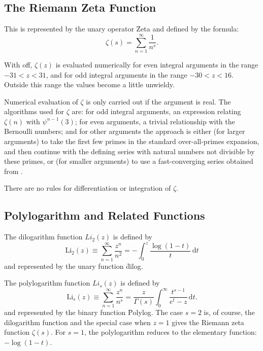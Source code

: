 \subsection{The Riemann Zeta Function}
\hypertarget{operator:ZETA}{}
\hypertarget{RIEMZETA}{}
This is represented by the unary operator \f{Zeta} and defined by the
formula:
$$\zeta(s) = \sum_{n=1}^\infty \frac{1}{n^s}.$$

With  off, $\zeta(z)$ is evaluated numerically for even
integral arguments in the range $-31 < z < 31$, and for odd integral
arguments in the range $-30 < z < 16$.  Outside this range the values
become a little unwieldy.

Numerical evaluation of $\zeta$ is only carried out if the argument is real.
The algorithms used for $\zeta$ are: for odd integral arguments, an
expression relating $\zeta(n)$ with $\psi^{n-1}(3)$; for even arguments, a
trivial relationship with the Bernoulli numbers; and for other arguments the
approach is either (for larger arguments) to take the first few primes in
the standard over-all-primes expansion, and then continue with the defining
series with natural numbers not divisible by these primes, or (for smaller
arguments) to use a fast-converging series obtained from \cite{BenderOrszag:78}.

There are no rules for differentiation or integration of $\zeta$.

\subsection{Polylogarithm and Related Functions}
\hypertarget{operator:LERCH_PHI}{}
\hypertarget{POLYLOG}{}
 
The dilogarithm function $Li_2(z)$ is defined by
$$\mathrm{Li}_2(z) \equiv \sum_{n=1}^\infty \frac{z^n}{n^2} =
-\int_0^z \frac{\log(1-t)}{t}\, \mathrm{d}t$$
and represented by the unary function \f{dilog}.

The polylogarithm function $Li_s(z)$ is defined by 
$$\mathrm{Li}_s(z) \equiv \sum_{n=1}^\infty \frac{z^n}{n^s} =
\frac{z}{\Gamma(s)} \int_0^\infty \frac{t^{s-1}}{e^t-z}\, \mathrm{d}t.$$
and represented by the binary function \f{Polylog}.
The case $s=2$ is, of course, the dilogarithm function and the special case
when $z=1$ gives the Riemann zeta function $\zeta(s)$. For $s=1$, the
polylogarithm reduces to the elementary function: $-\log(1-t)$.

